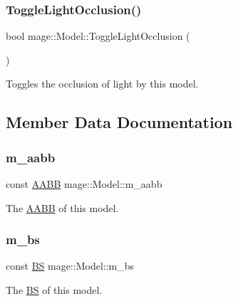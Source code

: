 \subsubsection{\texorpdfstring{Toggle\+Light\+Occlusion()}{ToggleLightOcclusion()}}
{\footnotesize\ttfamily bool mage\+::\+Model\+::\+Toggle\+Light\+Occlusion (\begin{DoxyParamCaption}{ }\end{DoxyParamCaption})\hspace{0.3cm}{\ttfamily [noexcept]}}

Toggles the occlusion of light by this model. 

\subsection{Member Data Documentation}
\hypertarget{classmage_1_1_model_ab53a0f253df545fd59723bee107bf523}{}\label{classmage_1_1_model_ab53a0f253df545fd59723bee107bf523} 
\subsubsection{\texorpdfstring{m\+\_\+aabb}{m\_aabb}}
{\footnotesize\ttfamily const \hyperlink{structmage_1_1_a_a_b_b}{A\+A\+BB} mage\+::\+Model\+::m\+\_\+aabb\hspace{0.3cm}{\ttfamily [private]}}

The \hyperlink{structmage_1_1_a_a_b_b}{A\+A\+BB} of this model. \hypertarget{classmage_1_1_model_a1d3ea0a9f302f623dcaceb2df4315a0b}{}\label{classmage_1_1_model_a1d3ea0a9f302f623dcaceb2df4315a0b} 
\subsubsection{\texorpdfstring{m\+\_\+bs}{m\_bs}}
{\footnotesize\ttfamily const \hyperlink{structmage_1_1_b_s}{BS} mage\+::\+Model\+::m\+\_\+bs\hspace{0.3cm}{\ttfamily [private]}}

The \hyperlink{structmage_1_1_b_s}{BS} of this model. \hypertarget{classmage_1_1_model_af6e1183a2f2147b7848aa10010bdfcd3}{}\label{classmage_1_1_model_af6e1183a2f2147b7848aa10010bdfcd3} 
